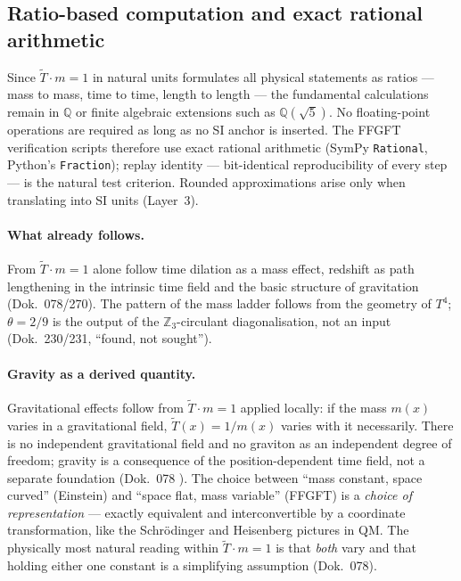 \subsection*{Ratio-based computation and exact rational arithmetic}

Since $\tilde{T}\cdot m=1$ in natural units formulates all physical statements as
ratios --- mass to mass, time to time, length to length --- the fundamental
calculations remain in $\mathbb{Q}$ or finite algebraic extensions such as
$\mathbb{Q}(\sqrt5)$. No floating-point operations are required as long as no SI
anchor is inserted. The FFGFT verification scripts therefore use exact rational
arithmetic (SymPy \texttt{Rational}, Python's \texttt{Fraction}); replay
identity --- bit-identical reproducibility of every step --- is the natural
test criterion. Rounded approximations arise only when translating into SI units
(Layer~3).

\paragraph{What already follows.}
From $\tilde{T}\cdot m=1$ alone follow time dilation as a mass effect, redshift
as path lengthening in the intrinsic time field and the basic structure of
gravitation (Dok.~078/270). The pattern of the mass ladder follows from the
geometry of $T^4$; $\theta=2/9$ is the output of the $\mathbb{Z}_3$-circulant
diagonalisation, not an input (Dok.~230/231, \enquote{found, not sought}).\label{sec:schicht1}

\paragraph{Gravity as a derived quantity.}
Gravitational effects follow from $\tilde T\cdot m=1$ applied locally: if the
mass $m(x)$ varies in a gravitational field, $\tilde T(x)=1/m(x)$ varies with
it necessarily. There is no independent gravitational field and no graviton as
an independent degree of freedom; gravity is a consequence of the
position-dependent time field, not a separate foundation (Dok.~078 \KM).
The choice between ``mass constant, space curved'' (Einstein) and ``space
flat, mass variable'' (FFGFT) is a \emph{choice of representation} ---
exactly equivalent and interconvertible by a coordinate transformation,
like the Schrödinger and Heisenberg pictures in QM. The physically most
natural reading within $\tilde T\cdot m=1$ is that \emph{both} vary and
that holding either one constant is a simplifying assumption (Dok.~078).

